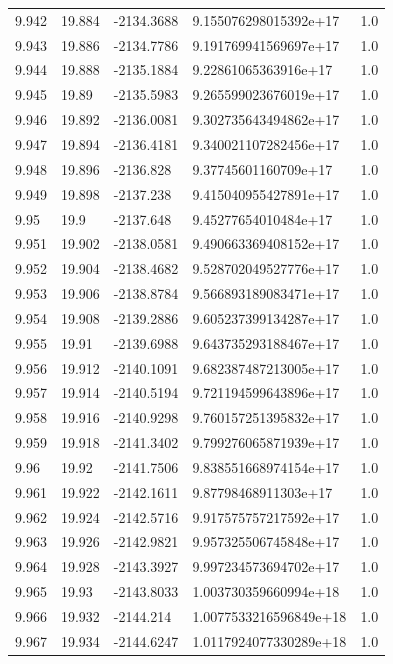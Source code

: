 \begin{tabular}{lllll}
9.942 & 19.884 & -2134.3688 & 9.155076298015392e+17 & 1.0 \\
9.943 & 19.886 & -2134.7786 & 9.191769941569697e+17 & 1.0 \\
9.944 & 19.888 & -2135.1884 & 9.22861065363916e+17 & 1.0 \\
9.945 & 19.89 & -2135.5983 & 9.265599023676019e+17 & 1.0 \\
9.946 & 19.892 & -2136.0081 & 9.302735643494862e+17 & 1.0 \\
9.947 & 19.894 & -2136.4181 & 9.340021107282456e+17 & 1.0 \\
9.948 & 19.896 & -2136.828 & 9.37745601160709e+17 & 1.0 \\
9.949 & 19.898 & -2137.238 & 9.415040955427891e+17 & 1.0 \\
9.95 & 19.9 & -2137.648 & 9.45277654010484e+17 & 1.0 \\
9.951 & 19.902 & -2138.0581 & 9.490663369408152e+17 & 1.0 \\
9.952 & 19.904 & -2138.4682 & 9.528702049527776e+17 & 1.0 \\
9.953 & 19.906 & -2138.8784 & 9.566893189083471e+17 & 1.0 \\
9.954 & 19.908 & -2139.2886 & 9.605237399134287e+17 & 1.0 \\
9.955 & 19.91 & -2139.6988 & 9.643735293188467e+17 & 1.0 \\
9.956 & 19.912 & -2140.1091 & 9.682387487213005e+17 & 1.0 \\
9.957 & 19.914 & -2140.5194 & 9.721194599643896e+17 & 1.0 \\
9.958 & 19.916 & -2140.9298 & 9.760157251395832e+17 & 1.0 \\
9.959 & 19.918 & -2141.3402 & 9.799276065871939e+17 & 1.0 \\
9.96 & 19.92 & -2141.7506 & 9.838551668974154e+17 & 1.0 \\
9.961 & 19.922 & -2142.1611 & 9.87798468911303e+17 & 1.0 \\
9.962 & 19.924 & -2142.5716 & 9.917575757217592e+17 & 1.0 \\
9.963 & 19.926 & -2142.9821 & 9.957325506745848e+17 & 1.0 \\
9.964 & 19.928 & -2143.3927 & 9.997234573694702e+17 & 1.0 \\
9.965 & 19.93 & -2143.8033 & 1.003730359660994e+18 & 1.0 \\
9.966 & 19.932 & -2144.214 & 1.0077533216596849e+18 & 1.0 \\
9.967 & 19.934 & -2144.6247 & 1.0117924077330289e+18 & 1.0 \\

\end{tabular}
